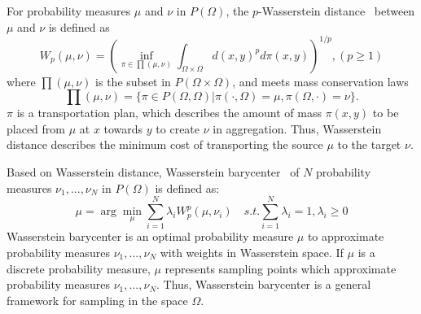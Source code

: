 For probability measures $\mu$ and $\nu$ in $P(\Omega)$,
the $p$-Wasserstein distance~\cite{villani:2008:optimal} between $\mu$ and $\nu$ is defined as
\begin{equation*}
  W_p(\mu,\nu)=\left(\inf\limits_{\pi\in\prod(\mu,\nu)}\int_{\Omega\times\Omega}d(x,y)^pd\pi(x,y)\right )^{1/p}, (p\geq1)
\end{equation*}
where $\prod(\mu,\nu)$ is the subset in $P(\Omega\times\Omega)$, and meets mass conservation laws
\begin{equation*}
\prod(\mu,\nu)=\{\pi\in P(\Omega,\Omega)|\pi(\cdot,\Omega)=\mu,\pi(\Omega,\cdot)=\nu\}.
\end{equation*}
$\pi$ is a transportation plan,
which describes the amount of mass $\pi(x,y)$ to be placed from $\mu$ at $x$ towards $y$ to create $\nu$ in aggregation.
Thus,
Wasserstein distance describes the minimum cost of transporting the source $\mu$ to the target $\nu$.


Based on Wasserstein distance,
Wasserstein barycenter~\cite{agueh:2011:barycenters,cuturi:2013:fast,BTSSPP:2016:Wasserstein} of $N$ probability measures ${\nu_1,...,\nu_N}$ in $P(\Omega)$ is defined as:
\begin{equation}\label{WB}
    \mu=\arg\min\limits_\mu\sum\limits_{i=1}^N\lambda_iW_p^p(\mu,\nu_i)  \quad
    s.t. \sum\limits_{i=1}^N\lambda_i=1, \lambda_i\geq0
\end{equation}
Wasserstein barycenter is an optimal probability measure $\mu$ to approximate probability measures ${\nu_1,...,\nu_N}$ with weights in Wasserstein space.
If $\mu$ is a discrete probability measure,
$\mu$ represents sampling points which approximate probability measures ${\nu_1,...,\nu_N}$.
Thus,
Wasserstein barycenter is a general framework for sampling in the space $\Omega$.








